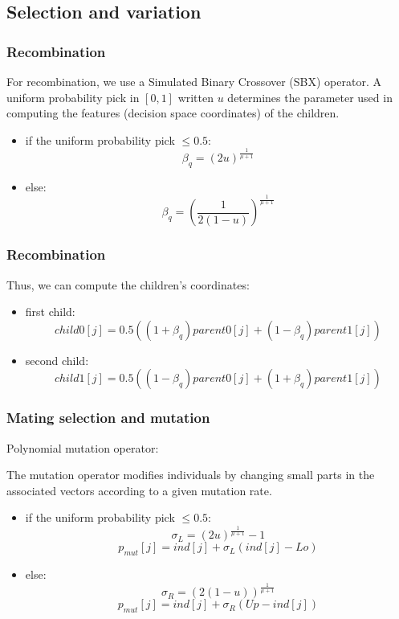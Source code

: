 \documentclass{beamer}
\begin{document}
\subsection{Selection and variation}
\begin{frame}
\frametitle{Recombination}
For recombination, we use a Simulated Binary Crossover (SBX) operator. A uniform probability pick in $[0,1]$ written $u$ determines the parameter used in computing the features (decision space coordinates) of the children.
\begin{itemize}
\item if the uniform probability pick $\leq 0.5$:
\begin{equation}
\beta_q = (2u)^{\frac{1}{\mu +1}}
\end{equation}
\item else:
\begin{equation}
\beta_q = (\frac{1}{2(1-u)})^{\frac{1}{\mu +1}}
\end{equation}
\end{itemize}
\end{frame}

\begin{frame}
\frametitle{Recombination}
Thus, we can compute the children's coordinates:

\begin{itemize}
\item first child:
\begin{equation}
child0[j] = 0.5((1+\beta_q)parent0[j]+(1-\beta_q)parent1[j])
\end{equation}
\item second child:
\begin{equation}
child1[j] = 0.5((1-\beta_q)parent0[j]+(1+\beta_q)parent1[j])
\end{equation}
\end{itemize}

\end{frame}

\begin{frame}
\frametitle{Mating selection and mutation}
Polynomial mutation operator:

The mutation operator modifies individuals by changing small parts in the associated vectors according to a given mutation rate.

\begin{itemize}
\item if the uniform probability pick $\leq 0.5$:
\begin{equation}
\sigma_L = (2u)^{\frac{1}{\mu +1}}-1 
\end{equation}
\begin{equation}
p_{mut}[j] = ind[j] + \sigma_L(ind[j]-Lo)
\end{equation}
\item else:
\begin{equation}
\sigma_R = (2(1-u))^{\frac{1}{\mu +1}} 
\end{equation}
\begin{equation}
p_{mut}[j] = ind[j] + \sigma_R(Up-ind[j])
\end{equation}
\end{itemize}

\end{frame}
\end{document}
